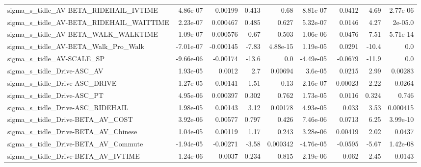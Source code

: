 \begin{tabular}{lrrrrrrrr}
sigma\_s\_tidle\_AV-BETA\_RIDEHAIL\_IVTIME              &    4.86e-07 &      0.00199 &     0.413 &     0.68 &   8.81e-07 &      0.0412 &         4.69 &      2.77e-06 \\
sigma\_s\_tidle\_AV-BETA\_RIDEHAIL\_WAITTIME            &    2.23e-07 &     0.000467 &     0.485 &    0.627 &   5.32e-07 &      0.0146 &         4.27 &       2e-05.0 \\
sigma\_s\_tidle\_AV-BETA\_WALK\_WALKTIME                &    1.09e-07 &     0.000576 &      0.67 &    0.503 &   1.06e-06 &      0.0476 &         7.51 &      5.71e-14 \\
sigma\_s\_tidle\_AV-BETA\_Walk\_Pro\_Walk                &   -7.01e-07 &    -0.000145 &     -7.83 & 4.88e-15 &   1.19e-05 &      0.0291 &        -10.4 &           0.0 \\
sigma\_s\_tidle\_AV-SCALE\_SP                          &   -9.66e-06 &     -0.00174 &     -13.6 &      0.0 &  -4.49e-05 &     -0.0679 &        -11.9 &           0.0 \\
sigma\_s\_tidle\_Drive-ASC\_AV                         &    1.93e-05 &       0.0012 &       2.7 &  0.00694 &    3.6e-05 &      0.0215 &         2.99 &       0.00283 \\
sigma\_s\_tidle\_Drive-ASC\_DRIVE                      &   -1.27e-05 &     -0.00141 &     -1.51 &     0.13 &  -2.16e-07 &    -0.00023 &        -2.22 &        0.0264 \\
sigma\_s\_tidle\_Drive-ASC\_PT                         &    4.95e-06 &     0.000397 &     0.302 &    0.762 &   1.73e-05 &      0.0116 &        0.324 &         0.746 \\
sigma\_s\_tidle\_Drive-ASC\_RIDEHAIL                   &    1.98e-05 &      0.00143 &      3.12 &  0.00178 &   4.93e-05 &       0.033 &         3.53 &      0.000415 \\
sigma\_s\_tidle\_Drive-BETA\_AV\_COST                   &    3.92e-06 &      0.00577 &     0.797 &    0.426 &   7.46e-06 &      0.0713 &         6.25 &      3.99e-10 \\
sigma\_s\_tidle\_Drive-BETA\_AV\_Chinese                &    1.04e-05 &      0.00119 &      1.17 &    0.243 &   3.28e-06 &     0.00419 &         2.02 &        0.0437 \\
sigma\_s\_tidle\_Drive-BETA\_AV\_Commute                &   -1.94e-05 &     -0.00271 &     -3.58 & 0.000342 &  -4.76e-05 &     -0.0595 &        -5.67 &      1.42e-08 \\
sigma\_s\_tidle\_Drive-BETA\_AV\_IVTIME                 &    1.24e-06 &       0.0037 &     0.234 &    0.815 &   2.19e-06 &       0.062 &         2.45 &        0.0143 \\

\end{tabular}
